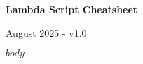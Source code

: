 \documentclass[8pt,landscape,a4paper]{article}
\begin{document}
\begin{center}
{\Large \textbf{Lambda Script Cheatsheet}}
\end{center}
\vspace{-8pt}
\begin{flushright}
{\small August 2025 - v1.0}
\end{flushright}

\vspace{3pt}

\begin{multicols*}{3}
\raggedright
$body$
\end{multicols*}
\end{document}
